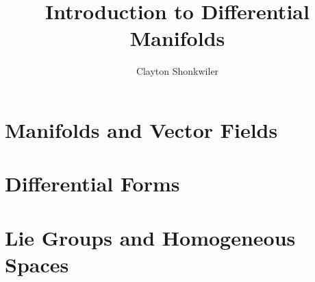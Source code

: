 \documentclass{report}
\title{Introduction to Differential Manifolds}
\author{Clayton Shonkwiler}
\date{}
\theoremstyle{definition}
\begin{document}
\maketitle

\tableofcontents

\chapter{Manifolds and Vector Fields}










\chapter{Differential Forms}










\chapter{Lie Groups and Homogeneous Spaces}




% 



\end{document}
